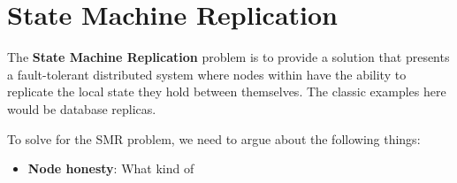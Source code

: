 \section{State Machine Replication}

The \textbf{State Machine Replication} problem is to provide a solution that presents a fault-tolerant distributed system where nodes within have the ability to replicate the local state they hold between themselves. The classic examples here would be database replicas.

To solve for the SMR problem, we need to argue about the following things:
\begin{itemize}
    \item \textbf{Node honesty}: What kind of 
\end{itemize}